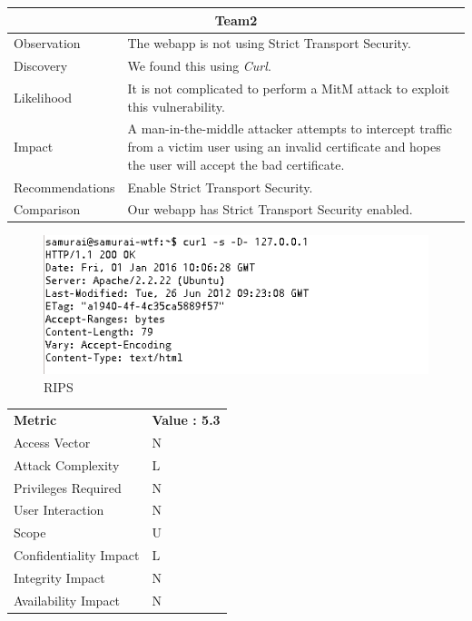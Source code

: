 \documentclass[headsepline,footsepline,footinclude=false,oneside,fontsize=11pt,paper=a4,listof=totoc,bibliography=totoc]{scrbook} %
\begin{document}
\begin{tabular}{ l|p{11cm}  }
	\hline
	\multicolumn{2}{c}{\textbf{Team2}} \\
	\hline
	Observation   &  The webapp is not using Strict Transport Security.  \\
	Discovery  &  We found this using \textit{Curl}.\\
	
	Likelihood & It is not complicated to perform a MitM attack to exploit this vulnerability. \\
	Impact    & A man-in-the-middle attacker attempts to intercept traffic from a victim user using an invalid certificate and hopes the user will accept the bad certificate. \\
	Recommendations & Enable Strict Transport Security. \\
	Comparison & Our webapp has Strict Transport Security enabled. \\
	\hline
\end{tabular}
 \begin{figure}[H]
 	\centering
 	\includegraphics[width=150mm]{logos/rsts.jpg}
 	\caption{RIPS \label{overflow}}
 \end{figure} 
 \begin{center}
 	\begin{tabular}{ll}
 		\rowcolor[HTML]{34CDF9}
 		{\color[HTML]{ECF4FF} \textbf{Metric}}        & {\color[HTML]{ECF4FF} \textbf{Value : 5.3}} \\
 		\rowcolor[HTML]{BBDAFF}
 		{\color[HTML]{333333} Access Vector}          & {\color[HTML]{333333} } N              \\
 		\rowcolor[HTML]{ECF4FF}
 		{\color[HTML]{333333} Attack Complexity}      & {\color[HTML]{333333} } L              \\
 		\rowcolor[HTML]{BBDAFF}
 		{\color[HTML]{333333} Privileges Required}    & {\color[HTML]{333333} } N              \\
 		\rowcolor[HTML]{ECF4FF}
 		{\color[HTML]{333333} User Interaction}       & {\color[HTML]{333333} } N              \\
 		\rowcolor[HTML]{BBDAFF}
 		{\color[HTML]{333333} Scope}                  & {\color[HTML]{333333} } U              \\
 		\rowcolor[HTML]{ECF4FF}
 		{\color[HTML]{333333} Confidentiality Impact} & {\color[HTML]{333333} } L              \\
 		\rowcolor[HTML]{BBDAFF}
 		{\color[HTML]{333333} Integrity Impact}       & {\color[HTML]{333333} } N              \\
 		\rowcolor[HTML]{ECF4FF}
 		{\color[HTML]{333333} Availability Impact}    & {\color[HTML]{333333} } N
 	\end{tabular}
 \end{center}
\pagebreak
\end{document}
